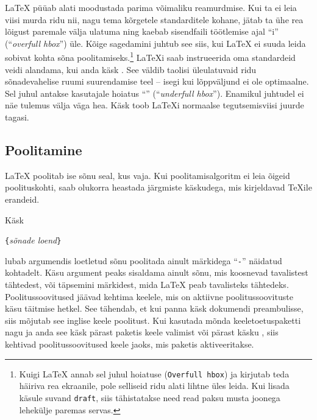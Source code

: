 \LaTeX{} püüab alati moodustada parima võimaliku reamurdmise. Kui ta ei
leia viisi murda ridu nii, nagu tema kõrgetele standarditele kohane,
jätab ta ühe rea lõigust paremale välja ulatuma ning kaebab sisendfaili
töötlemise ajal "`i"' ("`\emph{overfull hbox}"') üle. Kõige
sagedamini juhtub see siis, kui \LaTeX{} ei suuda leida sobivat kohta
sõna poolitamiseks.\footnote{Kuigi \LaTeX{} annab sel juhul hoiatuse
(\texttt{Overfull \bs{}hbox}) ja kirjutab teda häiriva rea ekraanile,
pole selliseid ridu alati lihtne üles leida. Kui lisada käsule
 suvand \texttt{draft},
siis tähistatakse need read paksu musta joonega lehekülje paremas
servas.} \LaTeX i saab instrueerida oma standardeid veidi alandama, kui
anda käsk . See väldib taolisi üleulatuvaid ridu
sõnadevahelise ruumi suurendamise teel -- isegi kui lõppväljund ei ole
optimaalne. Sel juhul antakse kasutajale hoiatus "`"' ("`\emph{underfull hbox}"'). Enamikul juhtudel ei näe tulemus välja
väga hea. Käsk  toob \LaTeX i normaalse tegutsemisviisi juurde
tagasi.

\subsection{Poolitamine} \label{hyph}

\LaTeX{} poolitab ise sõnu seal, kus vaja. Kui poolitamisalgoritm ei
leia õigeid poolituskohti, saab olukorra heastada järgmiste käskudega,
mis kirjeldavad \TeX ile erandeid.

Käsk
\begin{lscommand}
\verb|{|\emph{sõnade loend}\verb|}|
\end{lscommand}
\noindent lubab argumendis loetletud sõnu poolitada ainult märkidega
"`\verb|-|"' näidatud kohtadelt. Käsu argument peaks sisaldama ainult
sõnu, mis koosnevad tavalistest tähtedest, või täpsemini märkidest,
mida \LaTeX{} peab tavalisteks tähtedeks.
Poolitussoovitused jäävad kehtima keelele, mis
on aktiivne poolitussoovituste käsu täitmise hetkel. See tähendab, et
kui panna käsk dokumendi preambulisse, siis mõjutab see inglise keele
poolitust. Kui kasutada mõnda keeletoetuspaketti nagu  ja
anda see käsk pärast paketis keele valimist või pärast käsku
\verb||, siis kehtivad poolitussoovitused keele jaoks,
mis paketis aktiveeritakse.

